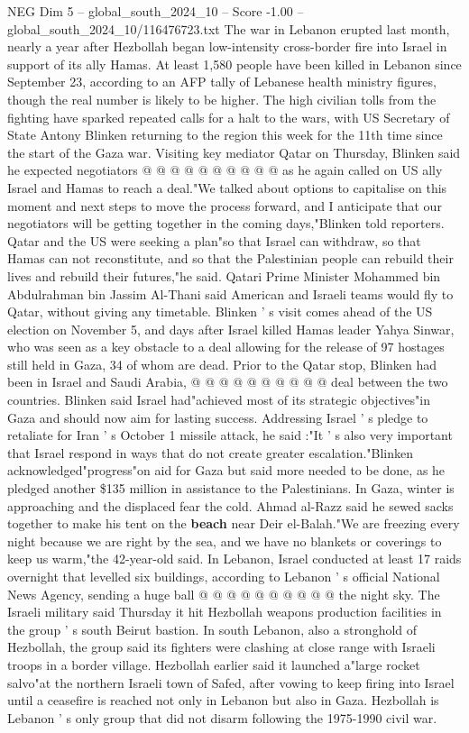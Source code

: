 \begin{textsample}{NEG Dim 5 – global\_south\_2024\_10 – Score -1.00 – global\_south\_2024\_10/116476723.txt}
The war in Lebanon erupted last month, nearly a year after Hezbollah began low-intensity cross-border fire into Israel in support of its ally Hamas.
At least 1,580 people have been killed in Lebanon since September 23, according to an AFP tally of Lebanese health ministry figures, though the real number is likely to be higher.
The high civilian tolls from the fighting have sparked repeated calls for a halt to the wars, with US Secretary of State Antony Blinken returning to the region this week for the 11th time since the start of the Gaza war.
Visiting key mediator Qatar on Thursday, Blinken said he expected negotiators @ @ @ @ @ @ @ @ @ @ as he again called on US ally Israel and Hamas to reach a deal."We talked about options to capitalise on this moment and next steps to move the process forward, and I anticipate that our negotiators will be getting together in the coming days,"Blinken told reporters.
Qatar and the US were seeking a plan"so that Israel can withdraw, so that Hamas can not reconstitute, and so that the Palestinian people can rebuild their lives and rebuild their futures,"he said.
Qatari Prime Minister Mohammed bin Abdulrahman bin Jassim Al-Thani said American and Israeli teams would fly to Qatar, without giving any timetable.
Blinken ' s visit comes ahead of the US election on November 5, and days after Israel killed Hamas leader Yahya Sinwar, who was seen as a key obstacle to a deal allowing for the release of 97 hostages still held in Gaza, 34 of whom are dead.
Prior to the Qatar stop, Blinken had been in Israel and Saudi Arabia, @ @ @ @ @ @ @ @ @ @ deal between the two countries.
Blinken said Israel had"achieved most of its strategic objectives"in Gaza and should now aim for lasting success.
Addressing Israel ' s pledge to retaliate for Iran ' s October 1 missile attack, he said :"It ' s also very important that Israel respond in ways that do not create greater escalation."Blinken acknowledged"progress"on aid for Gaza but said more needed to be done, as he pledged another \$135 million in assistance to the Palestinians.
In Gaza, winter is approaching and the displaced fear the cold.
Ahmad al-Razz said he sewed sacks together to make his tent on the \textbf{beach} near Deir el-Balah."We are freezing every night because we are right by the sea, and we have no blankets or coverings to keep us warm,"the 42-year-old said.
In Lebanon, Israel conducted at least 17 raids overnight that levelled six buildings, according to Lebanon ' s official National News Agency, sending a huge ball @ @ @ @ @ @ @ @ @ @ the night sky.
The Israeli military said Thursday it hit Hezbollah weapons production facilities in the group ' s south Beirut bastion.
In south Lebanon, also a stronghold of Hezbollah, the group said its fighters were clashing at close range with Israeli troops in a border village.
Hezbollah earlier said it launched a"large rocket salvo"at the northern Israeli town of Safed, after vowing to keep firing into Israel until a ceasefire is reached not only in Lebanon but also in Gaza.
Hezbollah is Lebanon ' s only group that did not disarm following the 1975-1990 civil war.

\end{textsample}
